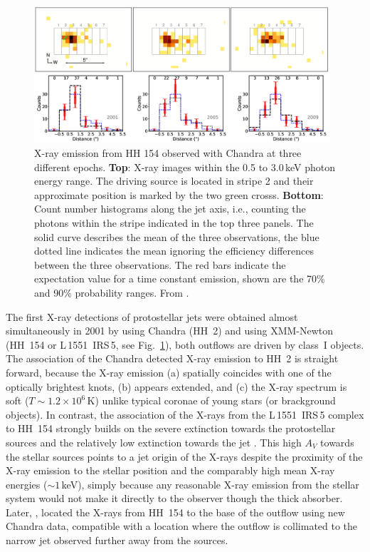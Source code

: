 \documentclass[graybox, nosecnum]{svmult}
\begin{document}
\begin{figure}[t]
\centering
\includegraphics[width=11cm]{figs/hh154_color}
\caption{X-ray emission from HH 154 observed with Chandra at three different epochs. {\bf Top}: X-ray images within the 0.5 to 3.0\,keV photon energy range. The driving source is located in stripe 2 and their approximate position is marked by the two green crosss. {\bf Bottom}: Count number histograms along the jet axis, i.e., counting the photons within the stripe indicated in the top three panels. The solid curve describes the mean of the three observations, the blue dotted line indicates the mean ignoring the efficiency differences between the three observations. The red bars indicate the expectation
value for a time constant emission, shown are the 70\% and 90\% probability ranges. From \citet{Schneider_2011}. \label{fig:hh154}}
\end{figure}


The first X-ray detections of protostellar jets were obtained almost simultaneously in 2001 by \citet{Pravdo_2001} using Chandra (HH~2) and \citet{Favata_2002}
using XMM-Newton (HH~154 or L\,1551~IRS\,5, see Fig.~\ref{fig:hh154}), both outflows are driven by class~I objects. The association of the Chandra detected X-ray emission to HH~2 is straight forward, because the X-ray emission  (a) spatially coincides with one of the optically brightest knots, (b) appears extended, and (c) the X-ray spectrum is soft ($T\sim1.2\times10^6\,$K) unlike typical coronae of young stars (or brackground objects). In contrast, the association of the X-rays from the L\,1551~IRS\,5 complex to HH~154 strongly builds on the severe extinction towards the protostellar sources and the relatively low extinction towards the jet \citep[$A_V(jet)\sim10\,$mag vs $A_V(protostars)\gtrsim150$\,mag, e.g.,][]{White_2000,Fridlund_2005}. This high $A_V$ towards the stellar sources points to a jet origin of the X-rays despite the proximity of the X-ray emission to the stellar position and the comparably high mean X-ray energies ($\sim1\,$keV), simply because any reasonable X-ray emission from the stellar system would not make it directly to the observer though the thick absorber. Later, \citet{Bally_2003}, located the X-rays from HH~154 to the base of the outflow using new Chandra data, compatible with a location where the outflow is collimated to the narrow jet observed further away from the sources. 
\end{document}
